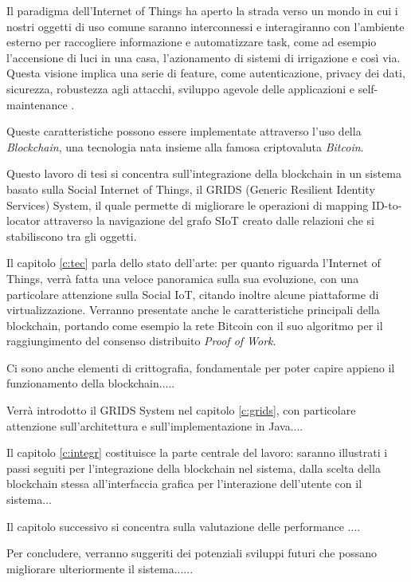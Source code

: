 Il paradigma dell'Internet of Things ha aperto la strada verso un mondo in cui i nostri oggetti di uso comune saranno interconnessi e interagiranno con l'ambiente esterno per raccogliere informazione e automatizzare task, come ad esempio l'accensione di luci in una casa, l'azionamento di sistemi di irrigazione e così via. Questa visione implica una serie di feature, come autenticazione, privacy dei dati, sicurezza, robustezza agli attacchi, sviluppo agevole delle applicazioni e self-maintenance \cite{Fernandez-Carames2018}.

Queste caratteristiche possono essere implementate attraverso l'uso della \textit{Blockchain}, una tecnologia nata insieme alla famosa criptovaluta \textit{Bitcoin}. 

Questo lavoro di tesi si concentra sull'integrazione della blockchain in un sistema basato sulla Social Internet of Things, il GRIDS (Generic Resilient Identity Services) System, il quale permette di migliorare le operazioni di mapping ID-to-locator attraverso la navigazione del grafo SIoT creato dalle relazioni che si stabiliscono tra gli oggetti.

Il capitolo \ref{c:tec} parla dello stato dell'arte: per quanto riguarda l'Internet of Things, verrà fatta una veloce panoramica sulla sua evoluzione, con una particolare attenzione sulla Social IoT, citando inoltre alcune piattaforme di virtualizzazione. Verranno presentate anche le caratteristiche principali della blockchain, portando come esempio la rete Bitcoin con il suo algoritmo per il raggiungimento del consenso distribuito \textit{Proof of Work}. 

Ci sono anche elementi di crittografia, fondamentale per poter capire appieno il funzionamento della blockchain.....

Verrà introdotto il GRIDS System nel capitolo \ref{c:grids}, con particolare attenzione sull'architettura e sull'implementazione in Java....

Il capitolo \ref{c:integr} costituisce la parte centrale del lavoro: saranno illustrati i passi seguiti per l'integrazione della blockchain nel sistema, dalla scelta della blockchain stessa all'interfaccia grafica per l'interazione dell'utente con il sistema...

Il capitolo successivo si concentra sulla valutazione delle performance ....

Per concludere, verranno suggeriti dei potenziali sviluppi futuri che possano migliorare ulteriormente il sistema......